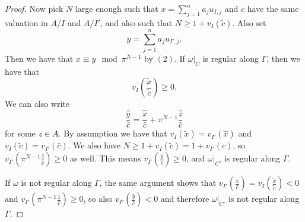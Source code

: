 \documentclass{article}
\theoremstyle{definition}
\theoremstyle{plain}
\theoremstyle{remark}
\begin{document}
\begin{proof}
		Now pick $N$ large enough such that $x = \sum_{j=1}^n a_j u_{I, j}$ and $c$ have the same valuation in $A/I$ and $A/I'$, and also such that $N\ge 1 + v_I(\widetilde{c})$. Also set
		\[y = \sum_{j=1}^n a_j u_{I', j}.\]
		Then we have that $x\equiv y \mod \pi^{N-1}$ by $(2)$. If $\omega|_C$ is regular along $\Gamma$, then we have that 
		\[v_I\left(\frac{\widetilde{x}}{\widetilde{c}}\right)\ge 0.\]
		We can also write
		\[\frac{\widehat{y}}{\widehat{c}} = \frac{\widehat{x}}{\widehat{c}} + \pi^{N-1}\frac{\widehat{z}}{\widehat{c}}\]
		for some $z\in A$. By assumption we have that $v_I(\widetilde{x}) = v_{I'}(\widehat{x})$ and $v_I(\widetilde{c}) = v_{I'}(\widehat{c})$. We also have $N\ge 1 + v_I(\widetilde{c}) = 1 + v_{I'}(\widehat{c})$, so $v_{I'}(\pi^{N-1}\frac{\widehat{z}}{\widehat{c}})\ge 0$ as well. This means $v_{I'}(\frac{\widehat{y}}{\widehat{c}})\ge 0$, and $\omega|_{C'}$ is regular along $\Gamma$.
		
		If $\omega$ is not regular along $\Gamma$, the same argument shows that $v_{I'}(\frac{\widehat{x}}{\widehat{c}}) = v_I(\frac{\widetilde{x}}{\widetilde{c}})<0$ and $v_{I'}(\pi^{N-1}\frac{\widehat{z}}{\widehat{c}})\ge 0$, so also $v_{I'}(\frac{\widehat{y}}{\widehat{c}})<0$ and therefore $\omega|_{C'}$ is not regular along $\Gamma$.
	\end{proof}
	
\end{document}

